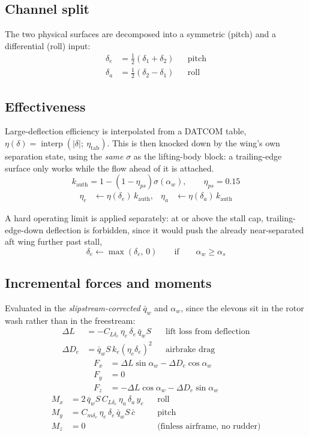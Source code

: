 \documentclass[11pt,a4paper]{article}
\newcommand{\interp}{\operatorname{interp}}
\begin{document}
\subsection{Channel split}
The two physical surfaces are decomposed into a symmetric (pitch) and a
differential (roll) input:
\begin{align}
\delta_e&=\tfrac12\left(\delta_1+\delta_2\right) &&\text{pitch}\\
\delta_a&=\tfrac12\left(\delta_2-\delta_1\right) &&\text{roll}
\end{align}

\subsection{Effectiveness}
Large-deflection efficiency is interpolated from a DATCOM table,
$\eta(\delta)=\interp\!\left(|\delta|;\ \eta_{\mathrm{tab}}\right)$.
This is then knocked down by the wing's own separation state, using the
\emph{same} $\sigma$ as the lifting-body block: a trailing-edge surface only
works while the flow ahead of it is attached.
\begin{equation}
k_{\mathrm{auth}}=1-\left(1-\eta_{ps}\right)\sigma(\alpha_w),
\qquad \eta_{ps}=0.15
\end{equation}
\begin{align}
\eta_e&\leftarrow\eta(\delta_e)\,k_{\mathrm{auth}}, &
\eta_a&\leftarrow\eta(\delta_a)\,k_{\mathrm{auth}}
\end{align}

A hard operating limit is applied separately: at or above the stall cap,
trailing-edge-down deflection is forbidden, since it would push the already
near-separated aft wing further past stall,
\begin{equation}
\delta_e\leftarrow\max\left(\delta_e,\,0\right)
\qquad\text{if}\qquad \alpha_w\ge\alpha_{s}
\end{equation}

\subsection{Incremental forces and moments}
Evaluated in the \emph{slipstream-corrected} $\bar q_w$ and $\alpha_w$, since the
elevons sit in the rotor wash rather than in the freestream:
\begin{align}
\Delta L&=-C_{L\delta_e}\,\eta_e\,\delta_e\,\bar q_w S
&&\text{lift loss from deflection}\\
\Delta D_e&=\bar q_w S\,k_e\left(\eta_e\delta_e\right)^{2}
&&\text{airbrake drag}
\end{align}
\begin{align}
F_x&=\Delta L\sin\alpha_w-\Delta D_e\cos\alpha_w\\
F_y&=0\\
F_z&=-\Delta L\cos\alpha_w-\Delta D_e\sin\alpha_w
\end{align}
\begin{align}
M_x&=2\,\bar q_w S\,C_{L\delta_e}\,\eta_a\,\delta_a\,y_{\!e} &&\text{roll}\\
M_y&=C_{m\delta_e}\,\eta_e\,\delta_e\,\bar q_w S\,\bar c &&\text{pitch}\\
M_z&=0 &&\text{(finless airframe, no rudder)}
\end{align}
\end{document}
